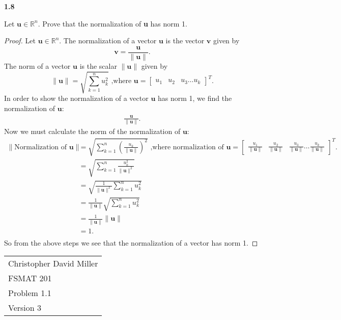 \documentclass[12pt]{article}
\begin{document}
\textbf{1.8} \\  %
\begin{prop}
Let $\mathbf{u} \in \mathbb{R}^n$. Prove that the normalization of \textbf{u} has norm 1.
\end{prop}
\begin{proof}
    Let $\mathbf{u} \in \mathbb{R}^n$.
    The normalization of a vector $\mathbf{u}$ is the vector $\mathbf{v}$ given by   
    \[\mathbf{v} = \frac{\mathbf{u}}{\| \mathbf{u} \|}.\] 
    The norm of a vector $\mathbf{u}$ is the scalar $\|  \mathbf{u} \|$ given by   
    $$\|  \mathbf{u} \| = \sqrt{\sum_{k=1}^{n}u_k^2} \text{ ,where } \mathbf{u} = \begin{bmatrix}u_1  &u_2& u_3 \dots u_k
       \end{bmatrix}^{T}.  $$ 
    In order to show the normalization of a vector $\mathbf{u}$ has norm 1, we find the normalization of $\mathbf{u}$:
       \begin{align*}
         \frac{\mathbf{u}}{\| \mathbf{u} \|}.
       \end{align*}
       Now we must calculate the norm of the normalization of $\mathbf{u}$:
        \begin{align*}
          \|  \text{Normalization of }\mathbf{u} \| &=  \sqrt{\sum_{k=1}^{n}\left(\frac{u_k}{\| \mathbf{u} \|}\right)^2} \text{ ,where normalization of  } \mathbf{u} = \begin{bmatrix}\frac{u_1}{\| \mathbf{u} \|}  &\frac{u_2}{\| \mathbf{u} \|}& \frac{u_3}{\| \mathbf{u} \|} \dots \frac{u_k}{\| \mathbf{u} \|}
          \end{bmatrix}^{T}.\\ 
                            &=  \sqrt{\sum_{k=1}^{n}\frac{u_k^2}{\| \mathbf{u} \|^2}} \\ 
                            &=  \sqrt{\frac{1}{\| \mathbf{u} \|^2}\sum_{k=1}^{n} u_k^2} \\
                            &=  \frac{1}{\| \mathbf{u} \|}\sqrt{\sum_{k=1}^{n} u_k^2} \\
                            &=  \frac{1}{\| \mathbf{u} \|} \| \mathbf{u} \| \\
                            &=  1. \\
        \end{align*}
        So from the above steps we see that the normalization of a vector has norm 1.  
\end{proof}
\newpage
\begin{flushright}
    \begin{tabular}{l}
    Christopher David Miller \\  %
    FSMAT 201 \\  %
    Problem 1.1 \\  %
    Version 3 \\ %
    \end{tabular}
    \end{flushright}
\end{document}
